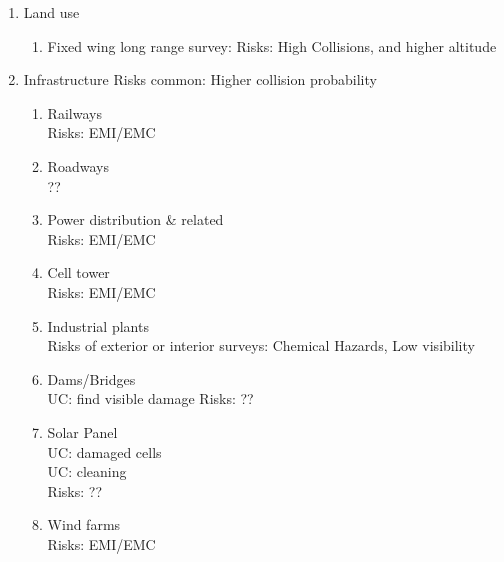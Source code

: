 \documentclass{ua_wgs_base}
\begin{document}
\begin{enumerate}


\item Land use
\begin{enumerate}
  \item Fixed wing long range survey: 
    Risks: High Collisions, and higher altitude
\end{enumerate}

\item Infrastructure
Risks common: Higher collision probability 
\begin{enumerate}
  \item Railways \\
    Risks: EMI/EMC
  \item Roadways \\
    ??
  \item Power distribution \& related \\
    Risks: EMI/EMC
  \item Cell tower \\
    Risks: EMI/EMC
  \item Industrial plants \\
    Risks of exterior or interior surveys: Chemical Hazards, Low visibility
  \item Dams/Bridges \\
    UC: find visible damage
    Risks: ??
  \item Solar Panel \\
    UC: damaged cells \\
    UC: cleaning \\
    Risks: ??
  \item Wind farms \\
    Risks: EMI/EMC
 
\end{enumerate}
\end{enumerate}
\end{document}
